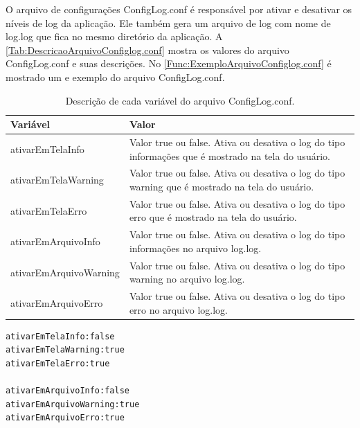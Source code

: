 O arquivo de configurações ConfigLog.conf é responsável por ativar e desativar os níveis de log da aplicação. Ele também gera um arquivo de log com nome de log.log que fica no mesmo diretório da aplicação. A \autoref{Tab:DescricaoArquivoConfiglog.conf} mostra os valores do arquivo ConfigLog.conf e suas descrições. No \autoref{Func:ExemploArquivoConfiglog.conf} é mostrado um e exemplo do arquivo ConfigLog.conf.

\begin{table}[H]
\centering
\begin{tabular}{|l|l|}
\hline
{\color[HTML]{000000} \textbf{Variável}} & {\color[HTML]{000000} \textbf{Valor}}                                                                \\ \hline
ativarEmTelaInfo                         & \multicolumn{1}{p{11.00cm}|}{Valor true ou false. Ativa ou desativa o log do tipo informações que é mostrado na tela do usuário.} \\ \hline
ativarEmTelaWarning                      & \multicolumn{1}{p{11.00cm}|}{Valor true ou false. Ativa ou desativa o log do tipo warning que é mostrado na tela do usuário.} \\ \hline
ativarEmTelaErro                         & \multicolumn{1}{p{11.00cm}|}{Valor true ou false. Ativa ou desativa o log do tipo erro que é mostrado na tela do usuário.}\\ \hline
ativarEmArquivoInfo                      & \multicolumn{1}{p{11.00cm}|}{Valor true ou false. Ativa ou desativa o log do tipo informações no arquivo log.log.}\\ \hline
ativarEmArquivoWarning                   & \multicolumn{1}{p{11.00cm}|}{Valor true ou false. Ativa ou desativa o log do tipo warning no arquivo log.log.}\\ \hline
ativarEmArquivoErro                      & \multicolumn{1}{p{11.00cm}|}{Valor true ou false. Ativa ou desativa o log do tipo erro no arquivo log.log.}\\ \hline
\end{tabular}
\caption[Descrição do arquivo ConfigLog.conf.]{Descrição de cada variável do arquivo ConfigLog.conf.}
\label{Tab:DescricaoArquivoConfiglog.conf}
\end{table}

\begin{lstlisting}[label=Func:ExemploArquivoConfiglog.conf,caption={[Exemplo de um arquivo ConfigLog.conf]Exemplo de um arquivo ConfigLog.conf}]
ativarEmTelaInfo:false
ativarEmTelaWarning:true
ativarEmTelaErro:true

ativarEmArquivoInfo:false
ativarEmArquivoWarning:true
ativarEmArquivoErro:true
\end{lstlisting}

